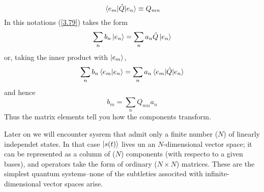 \begin{equation}\label{3.81}
	\mel{e_m}{\hat{Q}}{e_n}\equiv Q_{mn}
\end{equation}
In this notations (\ref{3.79}) takes the form
\begin{equation}\label{3.82}
	\sum_nb_n\ket{e_n}=\sum_na_n\hat{Q}\ket{e_n}
\end{equation}
or, taking the inner product with $\ket{e_m}$,
\begin{equation}\label{3.83}
	\sum_n b_n\braket{e_m}{e_n}=\sum_na_n\mel{e_m}{\hat{Q}}{e_n}
\end{equation}
and hence
\begin{equation}\label{3.84}
	b_m=\sum_nQ_{mn}a_n
\end{equation}
Thus the matrix elements tell you how the components transform. 

Later on we will encounter sysrem that admit only a finite number ($N$) of linearly independet states. In that case $\ket{s(t)}$ lives un an $N$-dimensional vector space; it can be represented as a column of ($N$) components (with respecto to a given bases), and operators take the form of ordinary ($N\times N$) matrices. These are the simplest quantum systems--none of the subtleties associted with infinite-dimensional vector spaces arise. 































